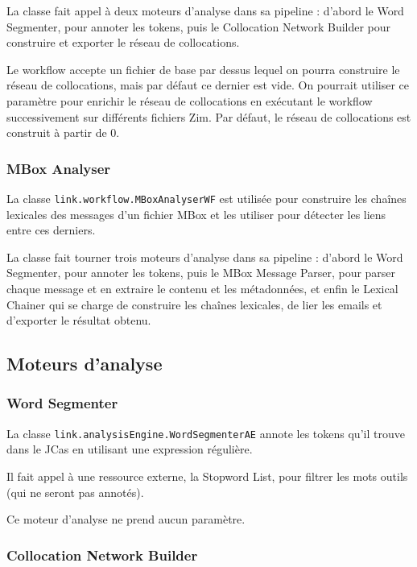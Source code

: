 \documentclass[a4paper]{article}
\begin{document}
La classe fait appel à deux moteurs d'analyse dans sa pipeline : d'abord le Word Segmenter, pour annoter les tokens, puis le Collocation Network Builder pour construire et exporter le réseau de collocations.

Le workflow accepte un fichier de base par dessus lequel on pourra construire le réseau de collocations, mais par défaut ce dernier est vide. On pourrait utiliser ce paramètre pour enrichir le réseau de collocations en exécutant le workflow successivement sur différents fichiers Zim. Par défaut, le réseau de collocations est construit à partir de 0.

\subsubsection{MBox Analyser}

La classe \texttt{link.workflow.MBoxAnalyserWF} est utilisée pour construire les chaînes lexicales des messages d'un fichier MBox et les utiliser pour détecter les liens entre ces derniers.

La classe fait tourner trois moteurs d'analyse dans sa pipeline : d'abord le Word Segmenter, pour annoter les tokens, puis le MBox Message Parser, pour parser chaque message et en extraire le contenu et les métadonnées, et enfin le Lexical Chainer qui se charge de construire les chaînes lexicales, de lier les emails et d'exporter le résultat obtenu.

\subsection{Moteurs d'analyse}

\subsubsection{Word Segmenter}
	
La classe \texttt{link.analysisEngine.WordSegmenterAE} annote les tokens qu'il trouve dans le JCas en utilisant une expression régulière.

Il fait appel à une ressource externe, la Stopword List, pour filtrer les mots outils (qui ne seront pas annotés).

Ce moteur d'analyse ne prend aucun paramètre.

\subsubsection{Collocation Network Builder}
\end{document}

